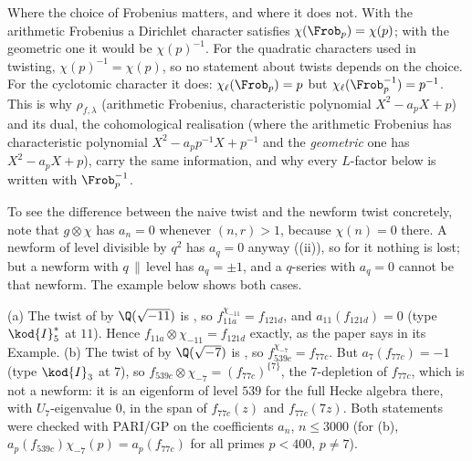 Where the choice of Frobenius matters, and where it does not. With the arithmetic Frobenius a Dirichlet character satisfies $\chi(\Frob_p)=\chi(p)$; with the
geometric one it would be $\chi(p)^{-1}$. For the quadratic characters used in twisting, $\chi(p)^{-1}=\chi(p)$, so no statement about twists depends on the choice. For the
cyclotomic character it does: $\chi_\ell(\Frob_p)=p$ but $\chi_\ell(\Frob_p^{-1})=p^{-1}$. This is why $\rho_{f,\lambda}$ (arithmetic Frobenius, characteristic polynomial $X^2-a_pX+p$) and its dual,
the cohomological realisation (where the arithmetic Frobenius has characteristic polynomial $X^2-a_pp^{-1}X+p^{-1}$ and the \emph{geometric} one has $X^2-a_pX+p$), carry the same
information, and why every $L$-factor below is written with $\Frob_p^{-1}$.

To see the difference between the naive twist and the newform twist concretely, note that $g\otimes\chi$ has $a_n=0$ whenever $(n,r)>1$, because $\chi(n)=0$ there. A newform
of level divisible by $q^2$ has $a_q=0$ anyway ((ii)), so for it nothing is lost; but a newform with $q\,\|\,$level has $a_q=\pm1$, and a
$q$-series with $a_q=0$ cannot be that newform. The example below shows both cases.

\begin{example}\label{ex:modgalrep:twist-dictionary}
(a) The twist of  by $\Q(\sqrt{-11})$ is , so $f_{11a}^{\chi_{-11}}=f_{121d}$, and $a_{11}(f_{121d})=0$ (type $\kod{I}_5^*$ at $11$). Hence
$f_{11a}\otimes\chi_{-11}=f_{121d}$ exactly, as the paper says in its Example. (b) The twist of  by $\Q(\sqrt{-7})$ is , so
$f_{539c}^{\chi_{-7}}=f_{77c}$. But $a_7(f_{77c})=-1$ (type $\kod{I}_3$ at $7$), so $f_{539c}\otimes\chi_{-7}=(f_{77c})^{\{7\}}$, the $7$-depletion of $f_{77c}$, which is not a newform:
it is an eigenform of level $539$ for the full Hecke algebra there, with $U_7$-eigenvalue $0$, in the span of $f_{77c}(z)$ and $f_{77c}(7z)$. Both
statements were checked with PARI/GP on the coefficients $a_n$, $n\le3000$ (for (b), $a_p(f_{539c})\chi_{-7}(p)=a_p(f_{77c})$ for all primes $p<400$, $p\ne7$).
\end{example}

